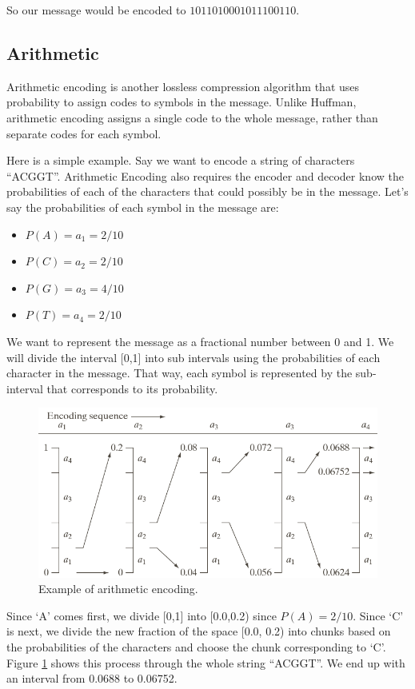 \documentclass[12pt,twoside]{reedthesis}
\providecommand{\tightlist}{%
  \setlength{\itemsep}{0pt}\setlength{\parskip}{0pt}}
\begin{document}
So our message would be encoded to \(1011010001011100110\).

\hypertarget{arithmetic}{%
\subsection{Arithmetic}\label{arithmetic}}

Arithmetic encoding is another lossless compression algorithm that uses probability to assign codes to symbols in the message. Unlike Huffman, arithmetic encoding assigns a single code to the whole message, rather than separate codes for each symbol.

Here is a simple example. Say we want to encode a string of characters ``ACGGT''. Arithmetic Encoding also requires the encoder and decoder know the probabilities of each of the characters that could possibly be in the message. Let's say the probabilities of each symbol in the message are:
\begin{itemize}
\tightlist
\item
  \(P(A) = a_1 = 2/10\)
\item
  \(P(C) = a_2 = 2/10\)
\item
  \(P(G) = a_3 = 4/10\)
\item
  \(P(T) = a_4 = 2/10\)
\end{itemize}
We want to represent the message as a fractional number between 0 and 1. We will divide the interval {[}0,1{]} into sub intervals using the probabilities of each character in the message. That way, each symbol is represented by the sub-interval that corresponds to its probability.
\begin{figure}

{\centering \includegraphics[width=0.9\linewidth]{figure/arithmeticencoding} 

}

\caption{Example of arithmetic encoding.}\label{fig:arithmeticencoding}
\end{figure}
Since `A' comes first, we divide {[}0,1{]} into {[}0.0,0.2) since \(P(A) = 2/10\). Since `C' is next, we divide the new fraction of the space {[}0.0, 0.2) into chunks based on the probabilities of the characters and choose the chunk corresponding to `C'. Figure \ref{fig:arithmeticencoding} shows this process through the whole string ``ACGGT''. We end up with an interval from 0.0688 to 0.06752.
\end{document}
